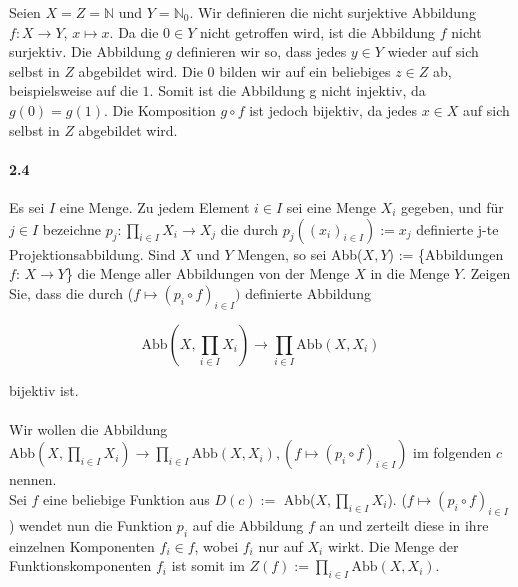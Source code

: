 \documentclass[12pt, letterpaper]{article}
\begin{document}
\noindent Seien $X = Z = \mathbb{N}$ und $Y = \mathbb{N}_0$. Wir definieren die nicht surjektive Abbildung $f: X \to Y$, $x \mapsto x$. Da die $0 \in Y$ nicht getroffen wird, ist die Abbildung $f$ nicht surjektiv. Die Abbildung $g$ definieren wir so, dass jedes $y \in Y$ wieder auf sich selbst in $Z$ abgebildet wird. Die $0$ bilden wir auf ein beliebiges $z \in Z$ ab, beispielsweise auf die $1$. Somit ist die Abbildung g nicht injektiv, da $g(0) = g(1)$. Die Komposition $g \circ f$ ist jedoch bijektiv, da jedes $x \in X$ auf sich selbst in $Z$ abgebildet wird. \\

\paragraph{2.4}

\noindent Es sei $I$ eine Menge. Zu jedem Element $i \in I$ sei eine Menge $X_i$ gegeben, und für $j \in I$ bezeichne $p_j: \prod_{i \in I}X_i \to X_j$ die durch $p_j((x_i)_{i \in I}) := x_j$ definierte j-te Projektionsabbildung.
Sind $X$ und $Y$ Mengen, so sei Abb($X, Y$) := \{Abbildungen $f$: $X \to Y$\} die Menge aller Abbildungen von der Menge $X$ in die Menge $Y$. Zeigen Sie, dass die durch ($f \mapsto (p_i \circ f)_{i \in I})$ definierte Abbildung

$$\text{Abb}(X, \prod_{i \in I}X_i) \to \prod_{i \in I}\text{Abb}(X, X_i)$$

\noindent bijektiv ist. \\ \\

\noindent Wir wollen die Abbildung $\text{Abb}(X, \prod_{i \in I}X_i) \to \prod_{i \in I}\text{Abb}(X, X_i), (f \mapsto (p_i \circ f)_{i \in I})$ im folgenden $c$ nennen.\\ 

\noindent Sei $f$ eine beliebige Funktion aus $D(c) :=$ Abb($X, \prod_{i \in I}X_i$). ($f \mapsto (p_i \circ f)_{i \in I}$) wendet nun die Funktion $p_i$ auf die Abbildung $f$ an und zerteilt diese in ihre einzelnen Komponenten $f_i \in f$, wobei $f_i$ nur auf $X_i$ wirkt. Die Menge der Funktionskomponenten $f_i$ ist somit im $Z(f) := \prod_{i \in I}\text{Abb}(X, X_i)$.\\
\end{document}
